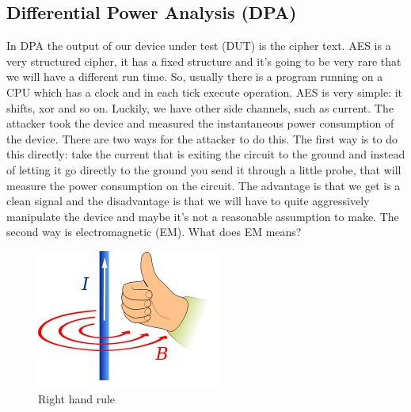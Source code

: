 \subsection{Differential Power Analysis (DPA)}\label{c8_prev_lectures_recap_dpa_sc:subsec}

In DPA \cite{kocher1999differential, kocher1998introduction} the output of our device under test (DUT) is the cipher text. AES is a
very structured cipher, it has a fixed structure and it's going to be very rare
that we will have a different run time. So, usually there is a program running
on a CPU which has a clock and in each tick execute operation. AES is very
simple: it shifts, xor and so on. Luckily, we have other side channels, such as
current. The attacker took the device and measured the instantaneous power
consumption of the device. There are two ways for the attacker to do this. The
first way is to do this directly: take the current that is exiting the circuit
to the ground and instead of letting it go directly to the ground you send it
through a little probe, that will measure the power consumption on the circuit.
The advantage is that we get is a clean signal and the disadvantage is that we
will have to quite aggressively manipulate the device and maybe it's not a
reasonable assumption to make. The second way is electromagnetic (EM). What does
EM means? 

\begin{figure}[!ht]
    \centering
    \includegraphics{images/chapter8/right_hand_rule.jpeg}
    \caption{Right hand rule} \label{c8_right_hand_rule:fig}
\end{figure}

